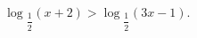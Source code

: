 \begin{ex}[type=inequality]
	\begin{condition}
		$ \log$\tiny$_{\dfrac{1}{2}}$\normalsize$(x + 2)>\log$\tiny$_{\dfrac{1}{2}}$\normalsize$(3x - 1) .$
	\end{condition}
\end{ex}